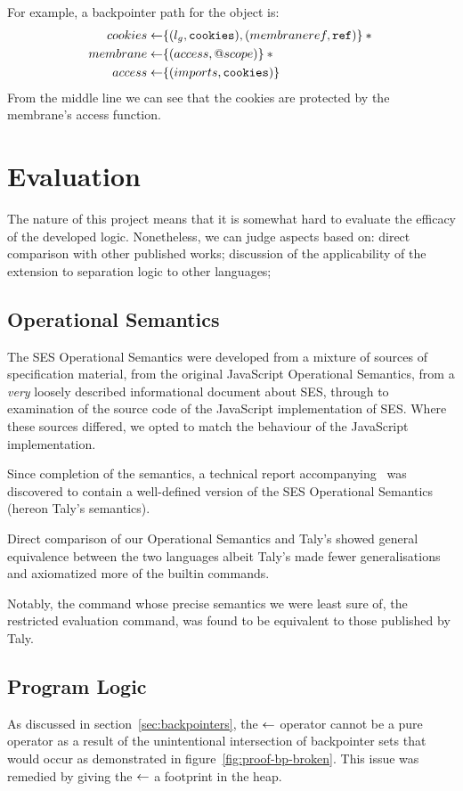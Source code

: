 \documentclass[a4paper,notitlepage]{report}
\begin{document}
For example, a backpointer path for the  object is:
\begin{align*}
  cookies \leftarrow & \{(l_g, \mathtt{cookies}), (membraneref, \mathtt{ref})\} \mathbin{*} {} \\
  membrane \leftarrow & \{(access, @scope)\} \mathbin{*} {} \\
  access \leftarrow & \{(imports, \mathtt{cookies})\}
\end{align*}
From the middle line we can see that the cookies are protected by the membrane's
access function.


\chapter{Evaluation}
The nature of this project means that it is somewhat hard to evaluate the
efficacy of the developed logic. Nonetheless, we can judge aspects based on:
direct comparison with other published works; discussion of the applicability of
the extension to separation logic to other languages; 

\section{Operational Semantics}
The SES Operational Semantics were developed from a mixture of sources of
specification material, from the original JavaScript Operational Semantics, from
a \emph{very} loosely described informational document about SES, through to
examination of the source code of the JavaScript implementation of SES.
Where these sources differed, we opted to match the behaviour of the JavaScript
implementation.

Since completion of the semantics, a technical report
accompanying~\cite{ses-semantics} was discovered to contain a well-defined
version of the SES Operational Semantics (hereon Taly's semantics).

Direct comparison of our Operational Semantics and Taly's
showed general equivalence between the two languages albeit Taly's made fewer
generalisations and axiomatized more of the builtin commands.

Notably, the command whose precise semantics we were least sure of, the
restricted evaluation command, was found to be equivalent to those published by
Taly.

\section{Program Logic}
As discussed in section~\ref{sec:backpointers}, the $\leftarrow$ operator cannot be a
pure operator as a result of the unintentional intersection of backpointer sets
that would occur as demonstrated in figure~\ref{fig:proof-bp-broken}. This issue
was remedied by giving the $\leftarrow$ a footprint in the heap.
\end{document}
